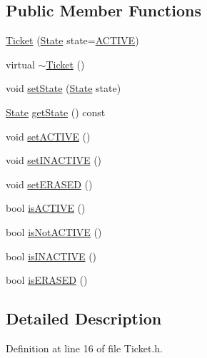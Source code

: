 \subsection*{Public Member Functions}
\begin{DoxyCompactItemize}
\item 
\hyperlink{classzbe_1_1_ticket_a54f4d3c170f63ee107ab6edc34c1c479}{Ticket} (\hyperlink{classzbe_1_1_ticket_a8325e68db1e22dd969cc089bac3b1c3c}{State} state=\hyperlink{classzbe_1_1_ticket_a8325e68db1e22dd969cc089bac3b1c3ca9a9c7fb95522615209a8db441eae9e53}{A\+C\+T\+I\+V\+E})
\item 
virtual \hyperlink{classzbe_1_1_ticket_af86d9ef8af586a7af4e6238f9e821eba}{$\sim$\+Ticket} ()
\item 
void \hyperlink{classzbe_1_1_ticket_a753f554fc268847f4ea468eba1ca3734}{set\+State} (\hyperlink{classzbe_1_1_ticket_a8325e68db1e22dd969cc089bac3b1c3c}{State} state)
\item 
\hyperlink{classzbe_1_1_ticket_a8325e68db1e22dd969cc089bac3b1c3c}{State} \hyperlink{classzbe_1_1_ticket_a2ecec85d07785fda1f67897487103efe}{get\+State} () const 
\item 
void \hyperlink{classzbe_1_1_ticket_ac27a6ce1050dbc48e15aed8fb2b64671}{set\+A\+C\+T\+I\+V\+E} ()
\item 
void \hyperlink{classzbe_1_1_ticket_a37002be23f9c6544e3c47002069cffd2}{set\+I\+N\+A\+C\+T\+I\+V\+E} ()
\item 
void \hyperlink{classzbe_1_1_ticket_ae36cc689edf4e7ee55df5133de3cb0b2}{set\+E\+R\+A\+S\+E\+D} ()
\item 
bool \hyperlink{classzbe_1_1_ticket_a5f7de9a861c79f17399b33eb619df537}{is\+A\+C\+T\+I\+V\+E} ()
\item 
bool \hyperlink{classzbe_1_1_ticket_a7cc36918cbabb0eede8e2b2789d914f9}{is\+Not\+A\+C\+T\+I\+V\+E} ()
\item 
bool \hyperlink{classzbe_1_1_ticket_afc202e4e6cbd889f162fd81ad1c0976a}{is\+I\+N\+A\+C\+T\+I\+V\+E} ()
\item 
bool \hyperlink{classzbe_1_1_ticket_a4992dd2f976a55943f35cfe11b903d9a}{is\+E\+R\+A\+S\+E\+D} ()
\end{DoxyCompactItemize}


\subsection{Detailed Description}


Definition at line 16 of file Ticket.\+h.



